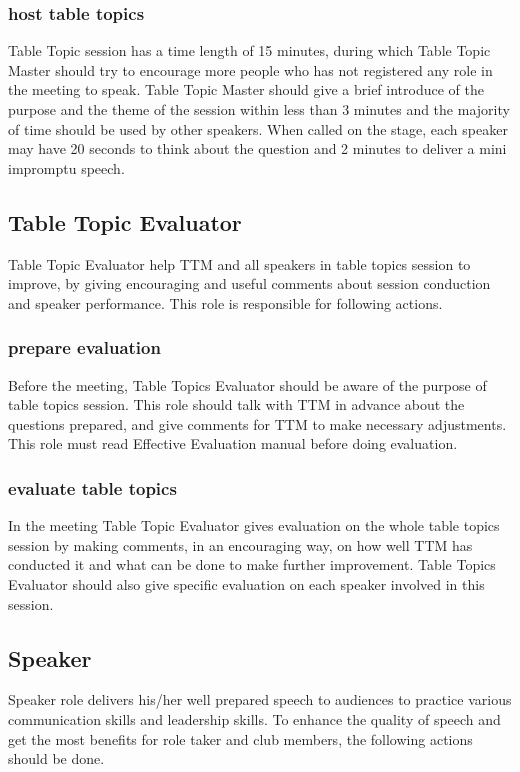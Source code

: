 \subsubsection{host table topics}
Table Topic session has a time length of 15 minutes, during which Table Topic Master 
should try to encourage more people who has not registered any role in the meeting to
speak. Table Topic Master should give a brief introduce of the purpose and the theme 
of the session within less than 3 minutes and the majority of time should be used by 
other speakers. When called on the stage, each speaker may have 20 seconds to think 
about the question and 2 minutes to deliver a mini impromptu speech. 

\subsection{Table Topic Evaluator}
Table Topic Evaluator help TTM and all speakers in table topics session to improve, by
giving encouraging and useful comments about session conduction and speaker performance.
This role is responsible for following actions.

\subsubsection{prepare evaluation}
Before the meeting, Table Topics Evaluator should be aware of the purpose of table
topics session. This role should talk with TTM in advance about the questions prepared, 
and give comments for TTM to make necessary adjustments. This role must read Effective 
Evaluation manual before doing evaluation.

\subsubsection{evaluate table topics}
In the meeting Table Topic Evaluator gives evaluation on the whole table topics session 
by making comments, in an encouraging way, on how well TTM has conducted it and what can 
be done to make further improvement. Table Topics Evaluator should also give specific 
evaluation on each speaker involved in this session.

\subsection{Speaker}
Speaker role  delivers his/her well prepared speech to audiences to practice various 
communication skills and leadership skills. To enhance the quality of speech and get the 
most benefits for role taker and club members, the following actions should be done.

